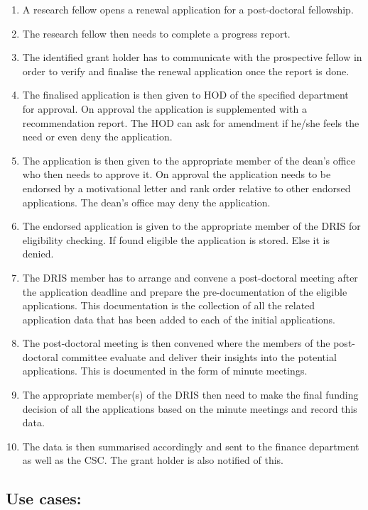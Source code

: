 \documentclass[12pt]{article}
\begin{document}
\begin{itemize}
		\begin{enumerate}
			\item A research fellow opens a renewal application for a post-doctoral fellowship.
			\item The research fellow then needs to complete a progress report.
			\item The identified grant holder has to communicate with the prospective fellow in order to verify and finalise the renewal application once the report is done.
			\item The finalised application is then given to HOD of the specified department for approval. On approval the application is supplemented with a recommendation report. The HOD can ask for amendment if he/she feels the need or even deny the application.
			\item The application is then given to the appropriate member of the dean's office who then needs to approve it. On approval the application needs to be endorsed by a motivational letter and rank order relative to other endorsed applications. The dean's office may deny the application.
			\item The endorsed application is given to the appropriate member of the DRIS for eligibility checking. If found eligible the application is stored. Else it is denied.
			\item The DRIS member has to arrange and convene a post-doctoral meeting after the application deadline and prepare the pre-documentation of the eligible applications. This documentation is the collection of all the related application data that has been added to each of the initial applications.
			\item The post-doctoral meeting is then convened where the members of the post-doctoral committee evaluate and deliver their insights into the potential applications. This is documented in the form of minute meetings. 
			\item The appropriate member(s) of the DRIS then need to make the final funding decision of all the applications based on the minute meetings and record this data.
			\item The data is then summarised accordingly and sent to the finance department as well as the CSC. The grant holder is also notified of this.   
		\end{enumerate}

	
\end{itemize}
\newpage
\subsection{Use cases:}
\end{document}
